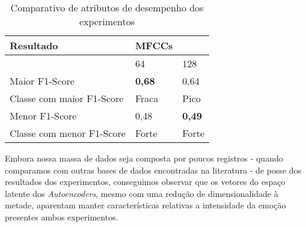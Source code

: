 
\begin{table}[]
    \centering
    \begin{tabular}{|l|l|l|}
    \hline
        Resultado & MFCCs & ~ \\ \hline
        ~ & 64 & 128 \\ \hline
        Maior F1-Score & \textbf{0,68} & 0,64 \\ \hline
        Classe com maior F1-Score & Fraca & Pico \\ \hline
        Menor F1-Score & 0,48 & \textbf{0,49} \\ \hline
        Classe com menor F1-Score & Forte & Forte \\ \hline
    \end{tabular}
    \caption{\label{table:compexp}Comparativo de atributos de desempenho dos experimentos}
\end{table}

Embora nossa massa de dados seja composta por poucos registros - quando comparamos com outras bases de dados encontradas na literatura - de posse dos resultados dos experimentos, conseguimos observar que os vetores do espaço latente dos \textit{Autoencoders}, mesmo com uma redução de dimensionalidade à metade, aparentam manter características relativas a intensidade da emoção presentes ambos experimentos.


